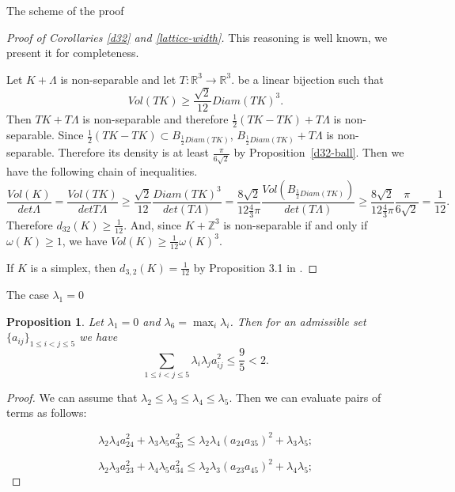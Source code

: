 \documentclass[12pt]{article}
\newtheorem{proposition}{Proposition}[section]
\begin{document}
\begin{section}{The scheme of the proof}
    \begin{proof}[Proof of Corollaries \ref{d32} and \ref{lattice-width}]
        This reasoning is well known, we present it for completeness. 

        
        Let $K + \Lambda$ is non-separable and let $T:\mathbb{R}^3\to \mathbb{R}^3.$ be a linear bijection such that $$Vol(TK)\geq \frac{\sqrt{2}}{12}Diam(TK)^3.$$
        Then $TK + T\Lambda$ is non-separable and therefore $\frac{1}{2}(TK-TK) + T\Lambda$ is non-separable. Since $\frac{1}{2}(TK-TK)\subset B_{\frac{1}{2}Diam(TK)}$, $B_{\frac{1}{2}Diam(TK)} + T\Lambda$ is non-separable. Therefore its density is at least $\frac{\pi}{6\sqrt{2}}$ by Proposition~\ref{d32-ball}. Then we have the following chain of inequalities.
        $$
            \frac{Vol(K)}{det \Lambda} = \frac{Vol(TK)}{det T\Lambda} \geq \frac{\sqrt{2}}{12}\frac{Diam(TK)^3}{det (T\Lambda)} = \frac{8\sqrt{2}}{12\frac{4}{3}\pi}\frac{Vol(B_{\frac{1}{2}Diam(TK)})}{det (T\Lambda)} \geq \frac{8\sqrt{2}}{12\frac{4}{3}\pi}\frac{\pi}{6\sqrt{2}} = \frac{1}{12}.
        $$
        Therefore $d_{32}(K)\geq \frac{1}{12}.$ And, since $K+\mathbb{Z}^3$ is non-separable if and only if $\omega(K)\geq 1$, we have  $Vol(K)\geq \frac{1}{12}\omega(K)^3.$ 

        If $K$ is a simplex, then  $d_{3,2}(K) = \frac{1}{12}$ by Proposition 3.1 in \cite{makai2016}.
        
    \end{proof}



\begin{section}{The case  \texorpdfstring{$\lambda_{1} = 0$}{Lg}}
\label{s5}

\begin{proposition}
\label{lambda-zero-case}
    Let $  \lambda_{1}=0$ and $\lambda_{6} = \max_{i}\lambda_{i}$. Then for an admissible set $\{a_{ij}\}_{1\leq i<j\leq 5}$ we have
    $$
        \sum_{1\leq i < j\leq 5}\lambda_{i}\lambda_{j} a_{ij}^{2} \leq \frac{9}{5}<2.
    $$
\end{proposition}

\begin{proof}
    We can assume that $\lambda_{2}\leq \lambda_{3}\leq \lambda_{4} \leq \lambda_{5}.$  Then we can evaluate pairs of terms as follows:
    
    $$
        \lambda_{2}\lambda_{4}a_{24}^{2} + \lambda_{3}\lambda_{5}a_{35}^{2} \leq \lambda_{2}\lambda_{4}(a_{24}a_{35})^{2} + \lambda_{3}\lambda_{5};
    $$

       $$
        \lambda_{2}\lambda_{3}a_{23}^{2} + \lambda_{4}\lambda_{5}a_{34}^{2} \leq \lambda_{2}\lambda_{3}(a_{23}a_{45})^{2} + \lambda_{4}\lambda_{5};
    $$


\end{proof}
\end{section}
\end{section}
\end{document}
